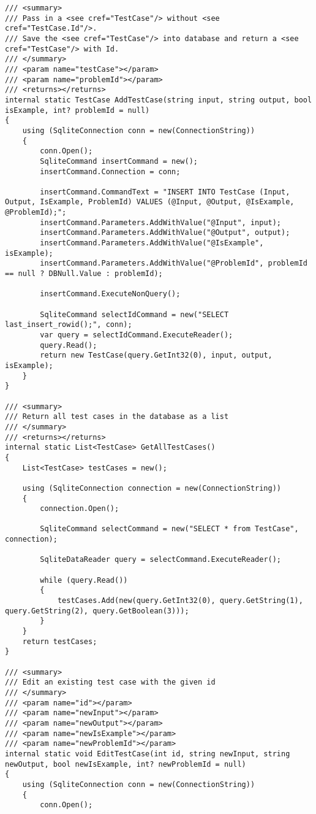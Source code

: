 \documentclass[report.tex]{subfiles}
\begin{document}
\begin{verbatim}
/// <summary>
/// Pass in a <see cref="TestCase"/> without <see cref="TestCase.Id"/>.
/// Save the <see cref="TestCase"/> into database and return a <see cref="TestCase"/> with Id.
/// </summary>
/// <param name="testCase"></param>
/// <param name="problemId"></param>
/// <returns></returns>
internal static TestCase AddTestCase(string input, string output, bool isExample, int? problemId = null)
{
    using (SqliteConnection conn = new(ConnectionString))
    {
        conn.Open();
        SqliteCommand insertCommand = new();
        insertCommand.Connection = conn;

        insertCommand.CommandText = "INSERT INTO TestCase (Input, Output, IsExample, ProblemId) VALUES (@Input, @Output, @IsExample, @ProblemId);";
        insertCommand.Parameters.AddWithValue("@Input", input);
        insertCommand.Parameters.AddWithValue("@Output", output);
        insertCommand.Parameters.AddWithValue("@IsExample", isExample);
        insertCommand.Parameters.AddWithValue("@ProblemId", problemId == null ? DBNull.Value : problemId);

        insertCommand.ExecuteNonQuery();

        SqliteCommand selectIdCommand = new("SELECT last_insert_rowid();", conn);
        var query = selectIdCommand.ExecuteReader();
        query.Read();
        return new TestCase(query.GetInt32(0), input, output, isExample);
    }
}

/// <summary>
/// Return all test cases in the database as a list
/// </summary>
/// <returns></returns>
internal static List<TestCase> GetAllTestCases()
{
    List<TestCase> testCases = new();

    using (SqliteConnection connection = new(ConnectionString))
    {
        connection.Open();

        SqliteCommand selectCommand = new("SELECT * from TestCase", connection);

        SqliteDataReader query = selectCommand.ExecuteReader();

        while (query.Read())
        {
            testCases.Add(new(query.GetInt32(0), query.GetString(1), query.GetString(2), query.GetBoolean(3)));
        }
    }
    return testCases;
}

/// <summary>
/// Edit an existing test case with the given id
/// </summary>
/// <param name="id"></param>
/// <param name="newInput"></param>
/// <param name="newOutput"></param>
/// <param name="newIsExample"></param>
/// <param name="newProblemId"></param>
internal static void EditTestCase(int id, string newInput, string newOutput, bool newIsExample, int? newProblemId = null)
{
    using (SqliteConnection conn = new(ConnectionString))
    {
        conn.Open();


\end{verbatim}
\end{document}
